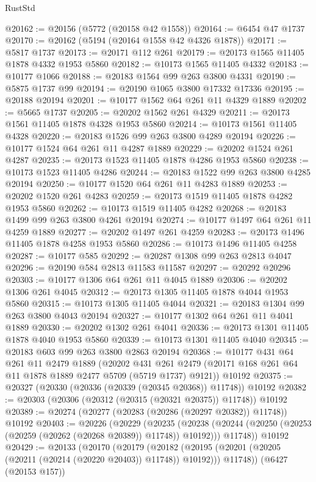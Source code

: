 \begin{lexlean}{RustStd}
\begin{coremodule}
@20162 := @20156 (@5772 (@20158 @42 @1558))
@20164 := @6454 @47 @1737
@20170 := @20162 (@5194 (@20164 @1558 @42 @4326 @1878))
@20171 := @5817 @1737
@20173 := @20171 @112 @261
@20179 := @20173 @1565 @11405 @1878 @4332 @1953 @5860
@20182 := @10173 @1565 @11405 @4332
@20183 := @10177 @1066
@20188 := @20183 @1564 @99 @263 @3800 @4331
@20190 := @5875 @1737 @99
@20194 := @20190 @1065 @3800 @17332 @17336
@20195 := @20188 @20194
@20201 := @10177 @1562 @64 @261 @11 @4329 @1889
@20202 := @5665 @1737
@20205 := @20202 @1562 @261 @4329
@20211 := @20173 @1561 @11405 @1878 @4328 @1953 @5860
@20214 := @10173 @1561 @11405 @4328
@20220 := @20183 @1526 @99 @263 @3800 @4289 @20194
@20226 := @10177 @1524 @64 @261 @11 @4287 @1889
@20229 := @20202 @1524 @261 @4287
@20235 := @20173 @1523 @11405 @1878 @4286 @1953 @5860
@20238 := @10173 @1523 @11405 @4286
@20244 := @20183 @1522 @99 @263 @3800 @4285 @20194
@20250 := @10177 @1520 @64 @261 @11 @4283 @1889
@20253 := @20202 @1520 @261 @4283
@20259 := @20173 @1519 @11405 @1878 @4282 @1953 @5860
@20262 := @10173 @1519 @11405 @4282
@20268 := @20183 @1499 @99 @263 @3800 @4261 @20194
@20274 := @10177 @1497 @64 @261 @11 @4259 @1889
@20277 := @20202 @1497 @261 @4259
@20283 := @20173 @1496 @11405 @1878 @4258 @1953 @5860
@20286 := @10173 @1496 @11405 @4258
@20287 := @10177 @585
@20292 := @20287 @1308 @99 @263 @2813 @4047
@20296 := @20190 @584 @2813 @11583 @11587
@20297 := @20292 @20296
@20303 := @10177 @1306 @64 @261 @11 @4045 @1889
@20306 := @20202 @1306 @261 @4045
@20312 := @20173 @1305 @11405 @1878 @4044 @1953 @5860
@20315 := @10173 @1305 @11405 @4044
@20321 := @20183 @1304 @99 @263 @3800 @4043 @20194
@20327 := @10177 @1302 @64 @261 @11 @4041 @1889
@20330 := @20202 @1302 @261 @4041
@20336 := @20173 @1301 @11405 @1878 @4040 @1953 @5860
@20339 := @10173 @1301 @11405 @4040
@20345 := @20183 @603 @99 @263 @3800 @2863 @20194
@20368 := @10177
    @431
    @64
    @261
    @11
    @2479
    @1889
    (@20202 @431 @261 @2479 (@20171 @168 @261 @64 @11 @1878 @1889 @2477 @5709 (@5719 @1737) @9121))
    @10192
@20375 := @20327 (@20330 (@20336 (@20339 (@20345 @20368)) @11748)) @10192
@20382 := @20303 (@20306 (@20312 (@20315 (@20321 @20375)) @11748)) @10192
@20389 := @20274 (@20277 (@20283 (@20286 (@20297 @20382)) @11748)) @10192
@20403 := @20226
    (@20229
      (@20235
        (@20238 (@20244 (@20250 (@20253 (@20259 (@20262 (@20268 @20389)) @11748)) @10192)))
        @11748))
    @10192
@20429 := @20133
    (@20170
      (@20179
        (@20182 (@20195 (@20201 (@20205 (@20211 (@20214 (@20220 @20403)) @11748)) @10192)))
        @11748))
    (@6427 (@20153 @157))

\end{coremodule}
\end{lexlean}
